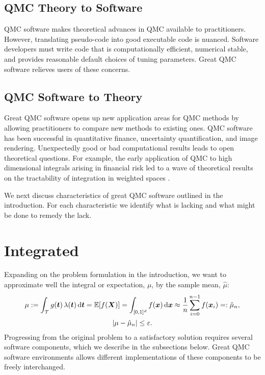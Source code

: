 \documentclass[graybox]{svmult}
\begin{document}
\subsection{QMC Theory to Software}

QMC software makes theoretical advances in QMC available to practitioners. However, translating pseudo-code into good executable code is nuanced.  Software developers must write code that is computationally efficient, numerical stable, and provides reasonable default choices of tuning parameters. Great QMC software relieves users of these concerns.

\subsection{QMC Software to Theory}

Great QMC software opens up new application areas for QMC methods by allowing practitioners to compare new methods to existing ones.  QMC software has been successful in quantitative finance, uncertainty quantification, and image rendering. Unexpectedly good or bad computational results leads to open theoretical questions.  For example, the early application of QMC to high dimensional integrals arising in financial risk \cite{PasTra95} led to a wave of theoretical results on the tractability of integration in weighted spaces \cite{Woz99a,DicEtal14a,NovWoz10a}.

We next discuss characteristics of great QMC software outlined in the introduction.  For each characteristic we identify what is lacking and what might be done to remedy the lack.

\section{Integrated} \label{CDHJS_sec:integrated}

Expanding on the problem formulation in the introduction, we want to approximate well the integral or expectation, $\mu$, by the sample mean, $\hat{\mu}$:
\begin{gather}
\label{eq:cubSummary}
	\mu : = \int_\calT g(\bst) \, \lambda(\bst) \, \D \bst  = \bbE[f(\bsX)] = \int_{[0,1]^d} f(\bsx)  \, \D \bsx \approx \frac 1n \sum_{i=0}^{n-1} f(\bsx_i) =: \hat{\mu}_n, \\
 \label{CDHJS_eq:error_tol}
 \abs{\mu - \hat{\mu}_n} \le \varepsilon.
\end{gather}
Progressing from the original problem to a satisfactory solution requires several software components, which we describe in the subsections below.  Great QMC software environments allows different implementations of these components to be freely interchanged.  
\end{document}
